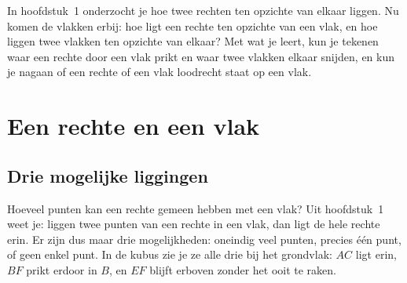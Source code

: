 In hoofdstuk~1 onderzocht je hoe twee rechten ten opzichte van elkaar liggen. Nu komen de vlakken erbij: hoe ligt een rechte ten opzichte van een vlak, en hoe liggen twee vlakken ten opzichte van elkaar? Met wat je leert, kun je tekenen waar een rechte door een vlak prikt en waar twee vlakken elkaar snijden, en kun je nagaan of een rechte of een vlak loodrecht staat op een vlak.

\begin{oefeningen}[Start]

\end{oefeningen}

\section{Een rechte en een vlak}

\subsection{Drie mogelijke liggingen}

Hoeveel punten kan een rechte gemeen hebben met een vlak? Uit hoofdstuk~1 weet je: liggen twee punten van een rechte in een vlak, dan ligt de hele rechte erin. Er zijn dus maar drie mogelijkheden: oneindig veel punten, precies één punt, of geen enkel punt. In de kubus zie je ze alle drie bij het grondvlak: $AC$ ligt erin, $BF$ prikt erdoor in $B$, en $EF$ blijft erboven zonder het ooit te raken.


